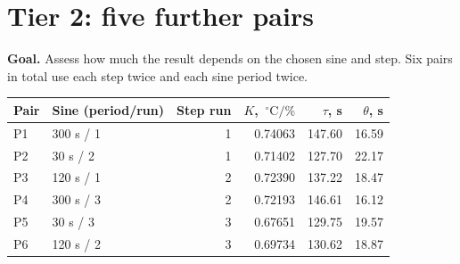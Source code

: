 \documentclass[10pt,letterpaper]{article}
\newcommand{\C}{\,^\circ\mathrm{C}}
\begin{document}
\FloatBarrier
\section{Tier 2: five further pairs}
\textbf{Goal.} Assess how much the result depends on the chosen sine and step. Six pairs in total use each step twice and each sine period twice.

\begin{tabular}{@{}llrrrr@{}}
\toprule
Pair & Sine (period/run) & Step run & $K$, $\C/\%$ & $\tau$, s & $\theta$, s\\
\midrule
P1 & 300 s / 1 & 1 & 0.74063 & 147.60 & 16.59\\
P2 & 30 s / 2 & 1 & 0.71402 & 127.70 & 22.17\\
P3 & 120 s / 1 & 2 & 0.72390 & 137.22 & 18.47\\
P4 & 300 s / 3 & 2 & 0.72193 & 146.61 & 16.12\\
P5 & 30 s / 3 & 3 & 0.67651 & 129.75 & 19.57\\
P6 & 120 s / 2 & 3 & 0.69734 & 130.62 & 18.87\\
\bottomrule
\end{tabular}
\end{document}
